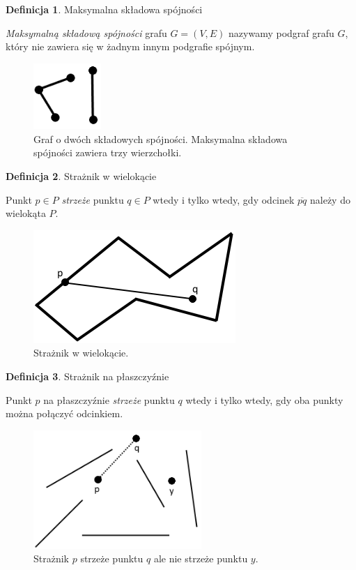\documentclass[brudnopis]{xmgr}
\theoremstyle{definition}
\newtheorem{Definicja}{Definicja}
\begin{document}
\begin{Definicja}{Maksymalna składowa spójności}
  
  \emph{Maksymalną składową spójności} grafu $G=(V,E)$ nazywamy podgraf grafu $G$, który nie zawiera się w żadnym innym podgrafie spójnym.
\end{Definicja}

\begin{figure}[ht!]
  \centering
  \includegraphics[height=2.5cm]{rysunki/graf_dwie_skladowe.png}
    \caption{Graf o dwóch składowych spójności. Maksymalna składowa spójności zawiera trzy wierzchołki.}
\end{figure} 

\begin{Definicja}{Strażnik w wielokącie}

  Punkt $p \in P$ \emph{strzeże} punktu $q \in P$ wtedy i tylko wtedy, gdy odcinek $\overline{pq}$ należy do wielokąta $P$.
\end{Definicja}

\begin{figure}[ht!]
  \centering
  \includegraphics{rysunki/straznik_wielokat.png}
    \caption{Strażnik w wielokącie.}
\end{figure} 

\begin{Definicja}{Strażnik na płaszczyźnie}
	
	Punkt $p$ na płaszczyźnie \emph{strzeże} punktu $q$ wtedy i tylko wtedy, gdy oba punkty można połączyć odcinkiem.
\end{Definicja}

\begin{figure}[ht!]
  \centering
  \includegraphics[height=4.5cm]{rysunki/straznik_na_plaszczyznie.png}
    \caption{Strażnik $p$ strzeże punktu $q$ ale nie strzeże punktu $y$.}
\end{figure} 
\end{document}
